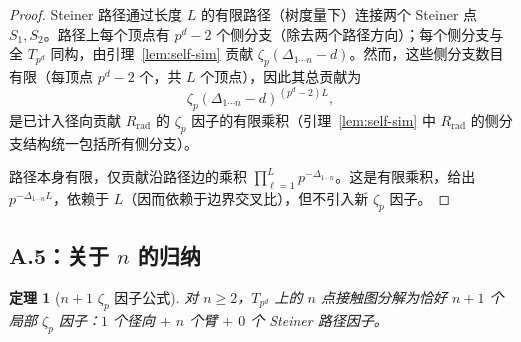 \documentclass[11pt,a4paper]{ctexart}
\newtheorem{theorem}{定理}[section]
\theoremstyle{remark}
\begin{document}
\begin{proof}
Steiner 路径通过长度 $L$ 的有限路径（树度量下）连接两个 Steiner 点 $S_1, S_2$。路径上每个顶点有 $p^d - 2$ 个侧分支（除去两个路径方向）；每个侧分支与全 $T_{p^d}$ 同构，由引理~\ref{lem:self-sim} 贡献 $\zeta_p(\Delta_{1\cdots n} - d)$。然而，这些侧分支数目有限（每顶点 $p^d - 2$ 个，共 $L$ 个顶点），因此其总贡献为
\begin{equation}
\zeta_p(\Delta_{1\cdots n} - d)^{(p^d - 2) L},
\end{equation}
是已计入径向贡献 $R_{\mathrm{rad}}$ 的 $\zeta_p$ 因子的有限乘积（引理~\ref{lem:self-sim} 中 $R_{\mathrm{rad}}$ 的侧分支结构统一包括所有侧分支）。

路径本身有限，仅贡献沿路径边的乘积 $\prod_{\ell=1}^L p^{-\Delta_{1\cdots n}}$。这是有限乘积，给出 $p^{-\Delta_{1\cdots n} L}$，依赖于 $L$（因而依赖于边界交叉比），但不引入新 $\zeta_p$ 因子。\qedhere
\end{proof}

\subsection{A.5：关于 $n$ 的归纳}

\begin{theorem}[$n{+}1$ $\zeta_p$ 因子公式]
\label{thm:nplus1}
对 $n \geq 2$，$T_{p^d}$ 上的 $n$ 点接触图分解为恰好 $n{+}1$ 个局部 $\zeta_p$ 因子：$1$ 个径向 $+$ $n$ 个臂 $+$ $0$ 个 Steiner 路径因子。
\end{theorem}
\end{document}
